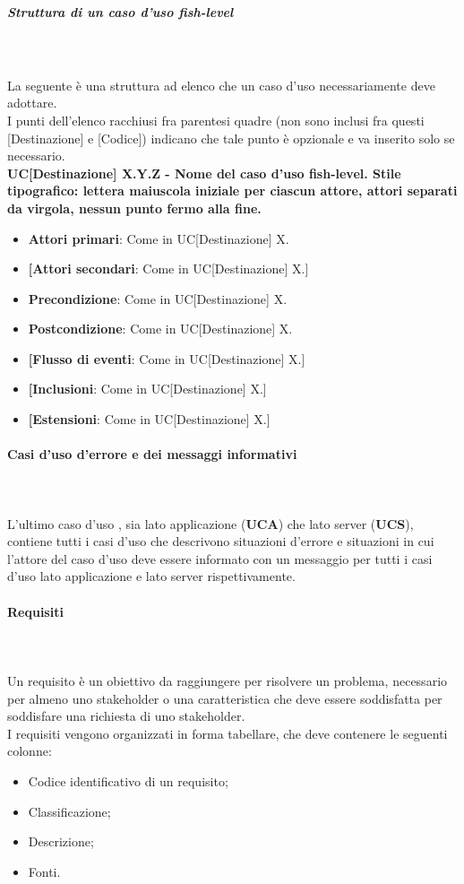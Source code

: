 \subparagraph*{Struttura di un caso d'uso fish-level}\mbox{}\\ \\
La seguente è una struttura ad elenco che un caso d'uso  necessariamente deve adottare.\\
I punti dell'elenco racchiusi fra parentesi quadre (non sono inclusi fra questi [Destinazione] e [Codice]) indicano che tale punto è opzionale e va inserito solo se necessario.\\
\textbf{UC[Destinazione] X.Y.Z - Nome del caso d'uso fish-level. Stile tipografico: lettera maiuscola iniziale per ciascun attore, attori separati da virgola, nessun punto fermo alla fine.}%
\begin{itemize}
	\item \textbf{Attori primari}: Come in UC[Destinazione] X.
	\item \textbf{[Attori secondari}: Come in UC[Destinazione] X.]
	\item \textbf{Precondizione}: Come in UC[Destinazione] X.
	\item \textbf{Postcondizione}: Come in UC[Destinazione] X.
	\item \textbf{[Flusso di eventi}: Come in UC[Destinazione] X.]
	\item \textbf{[Inclusioni}: Come in UC[Destinazione] X.]
	\item \textbf{[Estensioni}: Come in UC[Destinazione] X.]
\end{itemize}

\paragraph{Casi d'uso d'errore e dei messaggi informativi}\mbox{}\\ \\
L'ultimo caso d'uso , sia lato applicazione (\textbf{UCA}) che lato server (\textbf{UCS}), contiene tutti i casi d'uso che descrivono situazioni d'errore e situazioni in cui l'attore del caso d'uso deve essere informato con un messaggio per tutti i casi d'uso lato applicazione e lato server rispettivamente.\\
\paragraph{Requisiti}\mbox{}\\ \\
Un requisito è un obiettivo da raggiungere per risolvere un problema, necessario per almeno uno stakeholder o una caratteristica che deve essere soddisfatta per soddisfare una richiesta di uno stakeholder. \\
I requisiti vengono organizzati in forma tabellare, che deve contenere le seguenti colonne:
\begin{itemize}
	\item Codice identificativo di un requisito;
	\item Classificazione;
	\item Descrizione;
	\item Fonti.
\end{itemize}

